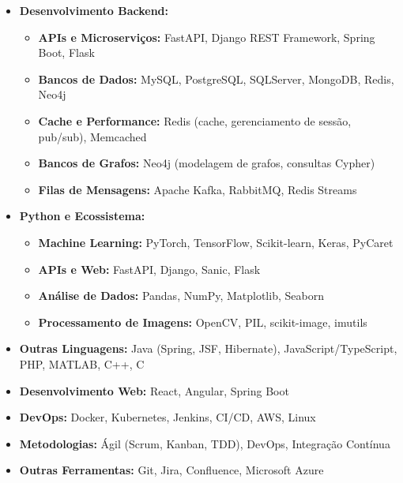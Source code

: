 \documentclass[12pt,a4paper,sans]{moderncv}
\begin{document}
\begin{itemize}
\item \textbf{Desenvolvimento Backend:}
  \begin{itemize}
    \item \textbf{APIs e Microserviços:} FastAPI, Django REST Framework, Spring Boot, Flask
    \item \textbf{Bancos de Dados:} MySQL, PostgreSQL, SQLServer, MongoDB, Redis, Neo4j
    \item \textbf{Cache e Performance:} Redis (cache, gerenciamento de sessão, pub/sub), Memcached
    \item \textbf{Bancos de Grafos:} Neo4j (modelagem de grafos, consultas Cypher)
    \item \textbf{Filas de Mensagens:} Apache Kafka, RabbitMQ, Redis Streams
  \end{itemize}
\vspace{2pt}

\item \textbf{Python e Ecossistema:}
  \begin{itemize}
    \item \textbf{Machine Learning:} PyTorch, TensorFlow, Scikit-learn, Keras, PyCaret
    \item \textbf{APIs e Web:} FastAPI, Django, Sanic, Flask
    \item \textbf{Análise de Dados:} Pandas, NumPy, Matplotlib, Seaborn
    \item \textbf{Processamento de Imagens:} OpenCV, PIL, scikit-image, imutils
  \end{itemize}
\vspace{2pt}

\item \textbf{Outras Linguagens:} Java (Spring, JSF, Hibernate), JavaScript/TypeScript, PHP, MATLAB, C++, C
\vspace{2pt}
\item \textbf{Desenvolvimento Web:} React, Angular, Spring Boot
\vspace{2pt}
\item \textbf{DevOps:} Docker, Kubernetes, Jenkins, CI/CD, AWS, Linux
\vspace{2pt}
\item \textbf{Metodologias:} Ágil (Scrum, Kanban, TDD), DevOps, Integração Contínua
\vspace{2pt}
\item \textbf{Outras Ferramentas:} Git, Jira, Confluence, Microsoft Azure
\end{itemize}
\end{document}
